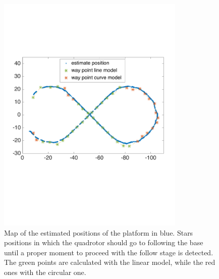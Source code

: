 \begin{figure}[!htbp]
    \centering
    \includegraphics[width=0.8\textwidth]{img/following_platform_long_map_waypoints.pdf}
    \caption{Map of the estimated positions of the platform in blue.  Stars positions in which the quadrotor should go to following the base until a proper moment to proceed with the follow stage is detected. The green points are calculated with the linear model, while the red ones with the circular one. }
    \label{fig:map_waypoints}
\end{figure}

